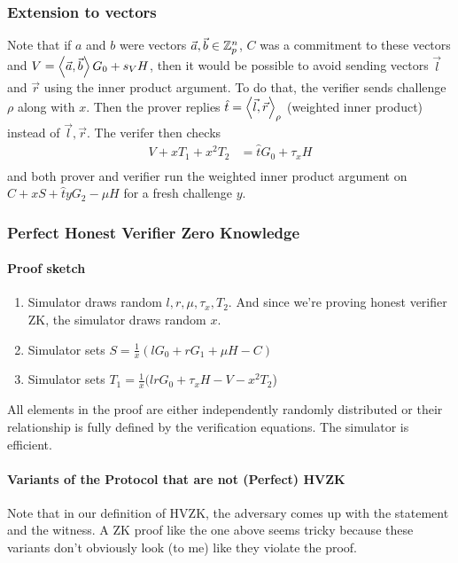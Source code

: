 \subsubsection{Extension to vectors}
Note that if $a$ and $b$ were vectors $\vec{a}, \vec{b} \in \mathbb{Z}_p^n$, $C$ was a commitment to these vectors and $V = \left\langle \vec{a}, \vec{b} \right\rangle G_0 + s_VH$, then it would be possible to avoid sending vectors $\vec{l}$ and $\vec{r}$ using the inner product argument.
To do that, the verifier sends challenge $\rho$ along with $x$.
Then the prover replies $\hat{t} = \left\langle \vec{l}, \vec{r} \right\rangle_{\rho}$ (weighted inner product) instead of $\vec{l}, \vec{r}$. The verifer then checks
\begin{align*}
  V + xT_1 + x^2T_2 &= \hat{t}G_0 + \tau_x H \\
\end{align*}
and both prover and verifier run the weighted inner product argument on $C + xS + \hat{t}yG_2 - \mu H$ for a fresh challenge $y$.

\subsubsection{Perfect Honest Verifier Zero Knowledge}

\paragraph{Proof sketch}
\begin{enumerate}
  \item Simulator draws random $l, r, \mu, \tau_x, T_2$. And since we're proving honest verifier ZK, the simulator draws random $x$.
  \item Simulator sets $S = \frac{1}{x}(lG_0 + rG_1 + \mu H - C)$
  \item Simulator sets $T_1 = \frac{1}{x}(lrG_0 + \tau_xH - V - x^2T_2$)
\end{enumerate}
All elements in the proof are either independently randomly distributed or their relationship is fully defined by the verification equations.
The simulator is efficient.

\paragraph{Variants of the Protocol that are not (Perfect) HVZK}
Note that in our definition of HVZK, the adversary comes up with the statement and the witness.
A ZK proof like the one above seems tricky because these variants don't obviously look (to me) like they violate the proof.

